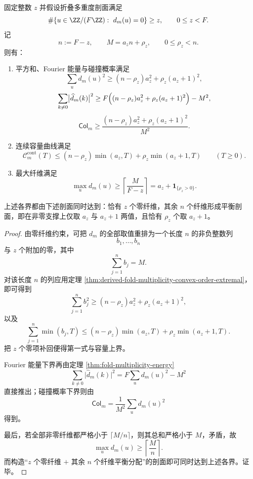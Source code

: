 \begin{theorem}[零纤维约束下的精确包络]\label{thm:derived-fold-multiplicity-zerofiber-envelope}
固定整数 \(z\) 并假设折叠多重度剖面满足
\[
\#\{u\in \ZZ/(F\ZZ):\ d_m(u)=0\}\ge z,
\qquad
0\le z<F.
\]
记
\[
n:=F-z,
\qquad
M=a_z n+\rho_z,
\qquad
0\le \rho_z<n.
\]
则有：
\begin{enumerate}
  \item 平方和、Fourier 能量与碰撞概率满足
  \[
  \sum_{u}d_m(u)^2
  \ge
  (n-\rho_z)a_z^2+\rho_z(a_z+1)^2,
  \]
  \[
  \sum_{k\ne 0}\bigl|\widehat d_m(k)\bigr|^2
  \ge
  F\Bigl((n-\rho_z)a_z^2+\rho_z(a_z+1)^2\Bigr)-M^2,
  \]
  \[
  \mathsf{Col}_m
  \ge
  \frac{(n-\rho_z)a_z^2+\rho_z(a_z+1)^2}{M^2}.
  \]

  \item 连续容量曲线满足
  \[
  \mathcal C_m^{\mathrm{cont}}(T)
  \le
  (n-\rho_z)\min(a_z,T)+\rho_z\min(a_z+1,T)
  \qquad (T\ge 0).
  \]

  \item 最大纤维满足
  \[
  \max_{u} d_m(u)
  \ge
  \left\lceil \frac{M}{F-z}\right\rceil
  =
  a_z+\mathbf 1_{\{\rho_z>0\}}.
  \]
\end{enumerate}
上述各界都由下述剖面同时达到：恰有 \(z\) 个零纤维，其余 \(n\) 个纤维形成平衡剖面，即在非零支撑上仅取 \(a_z\) 与 \(a_z+1\) 两值，且恰有 \(\rho_z\) 个取 \(a_z+1\)。
\end{theorem}
\begin{proof}
由零纤维约束，可把 \(d_m\) 的全部取值重排为一个长度 \(n\) 的非负整数列
\[
b_1,\dots,b_n
\]
与 \(z\) 个附加的零，其中
\[
\sum_{j=1}^{n} b_j=M.
\]
对该长度 \(n\) 的列应用定理 \ref{thm:derived-fold-multiplicity-convex-order-extremal}，即可得到
\[
\sum_{j=1}^{n} b_j^2
\ge
(n-\rho_z)a_z^2+\rho_z(a_z+1)^2,
\]
以及
\[
\sum_{j=1}^{n}\min(b_j,T)
\le
(n-\rho_z)\min(a_z,T)+\rho_z\min(a_z+1,T).
\]
把 \(z\) 个零项补回便得第一式与容量上界。

Fourier 能量下界再由定理 \ref{thm:fold-multiplicity-energy}
\[
\sum_{k\ne 0}\bigl|\widehat d_m(k)\bigr|^2
=
F\sum_u d_m(u)^2-M^2
\]
直接推出；碰撞概率下界则由
\[
\mathsf{Col}_m=\frac{1}{M^2}\sum_u d_m(u)^2
\]
得到。

最后，若全部非零纤维都严格小于 \(\lceil M/n\rceil\)，则其总和严格小于 \(M\)，矛盾，故
\[
\max_{u}d_m(u)\ge \left\lceil \frac{M}{n}\right\rceil.
\]
而构造“\(z\) 个零纤维 \(+\) 其余 \(n\) 个纤维平衡分配”的剖面即可同时达到上述各界。证毕。
\end{proof}

